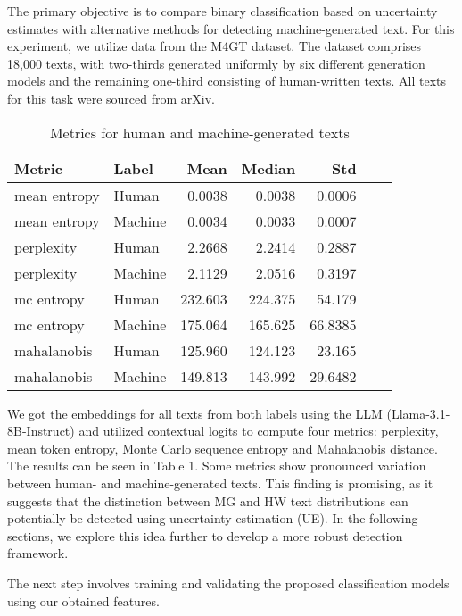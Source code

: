 \documentclass[a4paper, 12pt]{article}
\begin{document}
The primary objective is to compare binary classification based on uncertainty estimates with alternative methods for detecting machine-generated text. For this experiment, we utilize data from the M4GT dataset. The dataset comprises 18,000 texts, with two-thirds generated uniformly by six different generation models and the remaining one-third consisting of human-written texts. All texts for this task were sourced from arXiv.

\begin{table}[ht]
\centering
\begin{tabular}{llrrrrr}
\toprule
\textbf{Metric} & \textbf{Label} & \textbf{Mean} & \textbf{Median} & \textbf{Std}  \\
\midrule
mean entropy   & Human   & 0.0038   & 0.0038   & 0.0006    \\
mean entropy   & Machine   & 0.0034   & 0.0033   & 0.0007   \\
perplexity    & Human   & 2.2668   & 2.2414   & 0.2887   \\
perplexity    & Machine   & 2.1129   & 2.0516   & 0.3197  \\
mc entropy    & Human   & 232.603  & 224.375  & 54.179   \\
mc entropy    & Machine   & 175.064  & 165.625  & 66.8385  \\
mahalanobis   & Human   & 125.960  & 124.123  & 23.165  \\
mahalanobis   & Machine   & 149.813  & 143.992  & 29.6482   \\
\bottomrule
\end{tabular}
\caption{Metrics for human and machine-generated texts}
\label{tab:metric-by-label}
\end{table}


We got the embeddings for all texts from both labels using the LLM (Llama-3.1-8B-Instruct) and utilized contextual logits to compute four metrics: perplexity, mean token entropy, Monte Carlo sequence entropy and Mahalanobis distance. The results can be seen in Table 1. Some metrics show pronounced variation between human- and machine-generated texts. This finding is promising, as it suggests that the distinction between MG and HW text distributions can potentially be detected using uncertainty estimation (UE). In the following sections, we explore this idea further to develop a more robust detection framework. 

The next step involves training and validating the proposed classification models using our obtained features.
\end{document}
